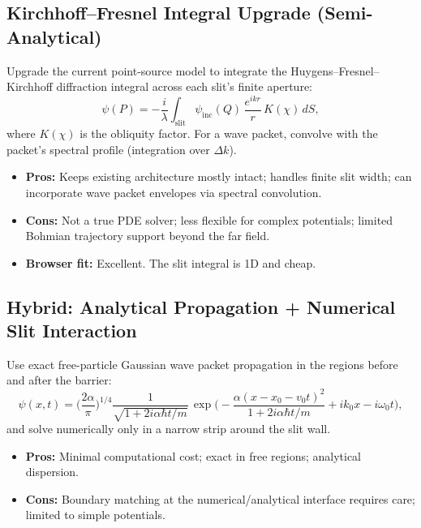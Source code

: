 \documentclass[11pt,a4paper]{article}
\begin{document}
\subsection{Kirchhoff--Fresnel Integral Upgrade (Semi-Analytical)}

Upgrade the current point-source model to integrate the Huygens--Fresnel--Kirchhoff diffraction integral across each slit's finite aperture:
\begin{equation}
  \psi(P) = -\frac{i}{\lambda}
  \int_{\text{slit}} \psi_{\text{inc}}(Q)\,
  \frac{e^{ikr}}{r}\,K(\chi)\,dS,
\end{equation}
where $K(\chi)$ is the obliquity factor. For a wave packet, convolve with the packet's spectral profile (integration over $\Delta k$).

\begin{itemize}
  \item \textbf{Pros:} Keeps existing architecture mostly intact; handles finite slit width; can incorporate wave packet envelopes via spectral convolution.
  \item \textbf{Cons:} Not a true PDE solver; less flexible for complex potentials; limited Bohmian trajectory support beyond the far field.
  \item \textbf{Browser fit:} Excellent. The slit integral is 1D and cheap.
\end{itemize}

\subsection{Hybrid: Analytical Propagation + Numerical Slit Interaction}

Use exact free-particle Gaussian wave packet propagation in the regions before and after the barrier:
\begin{equation}
  \psi(x,t) = \biggl(\frac{2\alpha}{\pi}\biggr)^{\!1/4}
  \frac{1}{\sqrt{1 + 2i\alpha\hbar t/m}}\,
  \exp\!\biggl(
    -\frac{\alpha(x - x_0 - v_0 t)^2}{1 + 2i\alpha\hbar t/m}
    + ik_0 x - i\omega_0 t
  \biggr),
\end{equation}
and solve numerically only in a narrow strip around the slit wall.

\begin{itemize}
  \item \textbf{Pros:} Minimal computational cost; exact in free regions; analytical dispersion.
  \item \textbf{Cons:} Boundary matching at the numerical/analytical interface requires care; limited to simple potentials.
\end{itemize}
\end{document}
